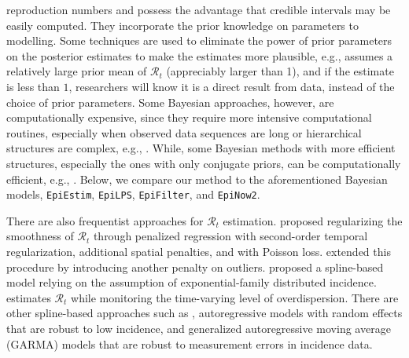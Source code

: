 \documentclass[10pt,letterpaper]{article}
\def\EpiEstim{\texttt{EpiEstim}}
\def\EpiLPS{\texttt{EpiLPS}}
\def\EpiFilter{\texttt{EpiFilter}}
\def\EpiNow2{\texttt{EpiNow2}}
\def\calR{\mathcal{R}}
\newcommand{\citep}[1]{\cite{#1}}
\begin{document}
reproduction numbers and possess the advantage that credible intervals may be
easily computed. They incorporate the prior knowledge on parameters to 
modelling. Some techniques are used to eliminate the power of prior parameters on 
the posterior estimates to make the estimates more plausible, e.g., 
\cite{thompson2019improved} assumes a relatively large prior mean of $\calR_t$ 
(appreciably larger than 1), and if the estimate is less than $1$, researchers will 
know it is a direct result from data, instead of the choice of prior parameters.
Some Bayesian approaches, however, are computationally expensive, since they 
require more intensive computational routines, especially when observed
data sequences are long or hierarchical structures are complex, e.g., 
\cite{abbott2020estimating}. While, some Bayesian methods with more efficient structures, 
especially the ones with only conjugate priors, can be computationally efficient,
e.g., \cite{cori2013new}. Below, we compare our method to the aforementioned Bayesian models,
\EpiEstim, \EpiLPS, \EpiFilter, and \EpiNow2. 


There are also frequentist approaches for $\calR_t$ estimation.
\cite{abry2020spatial} proposed regularizing the smoothness of $\calR_t$ through
penalized regression with second-order temporal regularization, additional
spatial penalties, and with Poisson loss. \cite{pascal2022nonsmooth} extended
this procedure by introducing another penalty on outliers.
\cite{pircalabelu2023spline} proposed a spline-based model relying on the
assumption of exponential-family distributed incidence. \cite{ho2023accounting}
estimates $\calR_t$ while monitoring the time-varying level of overdispersion.
There are other spline-based approaches such as
\cite{azmon2014estimation,gressani2021approximate}, autoregressive models with
random effects \citep{jin2023epimix} that are robust to low incidence, and
generalized autoregressive moving average (GARMA) models
\citep{hettinger2023estimating} that are robust to measurement errors in
incidence data. 
\end{document}
